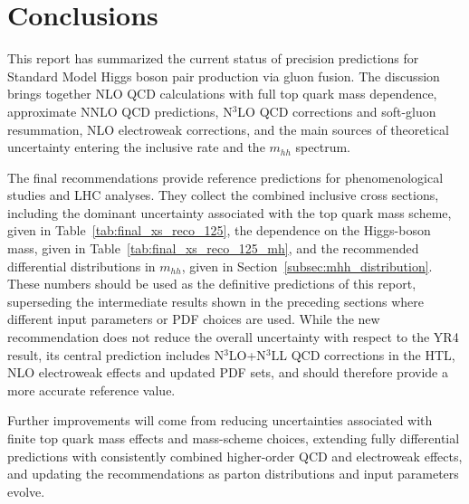 \FloatBarrier

\section{Conclusions}
\label{sec:conclusions}

This report has summarized the current status of precision predictions for
Standard Model Higgs boson pair production via gluon fusion. The discussion
brings together NLO QCD calculations with full top quark mass dependence,
approximate NNLO QCD predictions, N$^3$LO QCD corrections and soft-gluon
resummation, NLO electroweak corrections, and the main sources of theoretical
uncertainty entering the inclusive rate and the $m_{hh}$ spectrum.

The final recommendations provide reference predictions for phenomenological
studies and LHC analyses. They collect the combined inclusive cross sections,
including the dominant uncertainty associated with the top quark mass scheme,
given in Table~\ref{tab:final_xs_reco_125},
the dependence on the Higgs-boson mass, given in
Table~\ref{tab:final_xs_reco_125_mh},
and the recommended differential distributions in $m_{hh}$, given in
Section~\ref{subsec:mhh_distribution}.
These numbers should be used as the definitive
predictions of this report, superseding the intermediate results shown in the
preceding sections where different input parameters or PDF choices are used.
While the new recommendation does not reduce the overall
uncertainty with respect to the YR4 result, its central prediction includes N$^3$LO+N$^3$LL QCD corrections in the HTL, NLO
electroweak effects and updated PDF sets, and should therefore provide a more
accurate reference value.

Further improvements will come from reducing uncertainties associated with finite top quark mass effects and
mass-scheme choices, extending fully differential predictions with
consistently combined higher-order QCD and electroweak effects, and updating the
recommendations as parton distributions and input parameters evolve.
